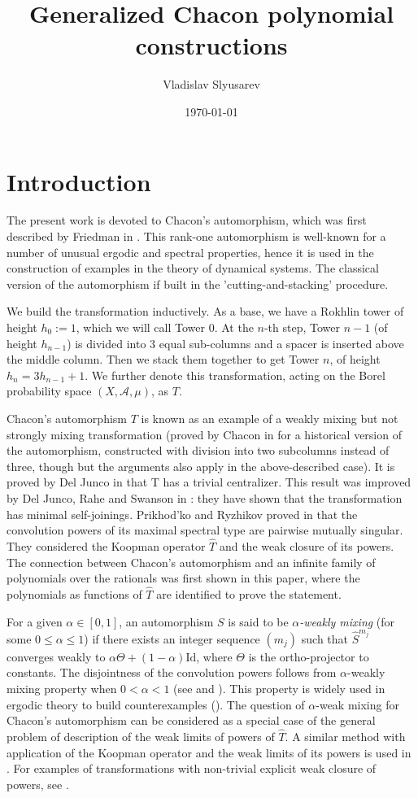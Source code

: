 \documentclass[a4paper]{article}
\title{Generalized Chacon polynomial constructions}
\author{Vladislav Slyusarev}
\date{\today}
\theoremstyle{plain}
\theoremstyle{definition}
\begin{document}
\maketitle

\section{Introduction}
The present work is devoted to Chacon’s automorphism, which was first described by Friedman in \cite{friedman}. This rank-one automorphism is well-known for a number of unusual ergodic and
spectral properties, hence it is used in the construction of examples in the theory of dynamical systems. The classical version of the automorphism if built in the 'cutting-and-stacking' procedure.

We build the transformation inductively. As a base, we have a Rokhlin tower of height $h_0 := 1$, which we will call Tower 0. At the $n$-th step, Tower $n-1$ (of height $h_{n-1}$) is divided into $3$ equal sub-columns and a spacer is inserted above the middle
column. Then we stack them together to get Tower $n$, of height $h_n=3h_{n-1}+1$. We further denote this transformation, acting on the Borel probability
space $(X,\mathcal{A},\mu)$, as $T$.

Chacon's automorphism $T$ is known as an example of a weakly mixing but not strongly mixing transformation (proved by Chacon in \cite{mixing} for a historical version of the automorphism, constructed with division into two subcolumns instead of three, though
but the arguments also apply in the above-described case). It is proved by Del Junco
in \cite{deljunco} that T has a trivial centralizer. This result was improved by Del Junco, Rahe and Swanson in \cite{joinings}: they have shown that the transformation has minimal self-joinings. Prikhod'ko and Ryzhikov proved in \cite{convolutions} that the convolution powers of its maximal spectral type are pairwise mutually singular. They considered the Koopman operator $\hat{T}$ and the weak closure of its powers. The connection between Chacon's automorphism and an infinite family of polynomials over the rationals was first shown in this paper, where the polynomials as functions of $\hat{T}$ are identified to prove the statement.

For a given $\alpha \in \left[0, 1\right]$, an automorphism $S$ is said to be \emph{$\alpha$-weakly mixing} (for some $0\le \alpha \le 1$) if there exists an integer sequence $(m_j)$ such that $\hat{S}^{m_j}$ converges weakly to $\alpha \Theta + (1-\alpha)\mathrm{Id}$, where $\Theta$ is the ortho-projector to constants. The disjointness of the convolution powers follows from $\alpha$-weakly mixing property when $0 < \alpha < 1$ (see \cite{katok} and \cite{stepin}). This property is widely used in ergodic theory to build counterexamples (\cite{deljunco1992}). The question of $\alpha$-weak mixing for Chacon’s automorphism can be considered as a special case of the general problem of description of the weak limits of powers of $\hat{T}$. A similar method with application  of the Koopman operator and the weak
limits of its powers is used in \cite{delarue2012}. For examples of transformations
with non-trivial explicit weak closure of powers, see \cite{ryzhikov}.
\end{document}
